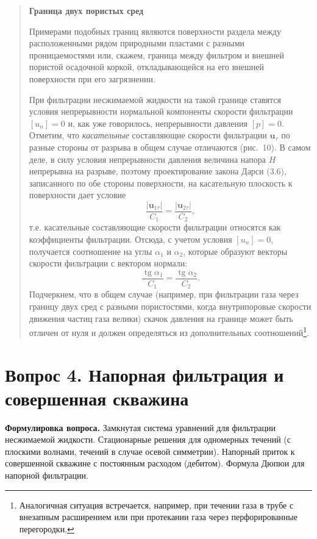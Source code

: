 \documentclass[12pt,a4paper]{article}
\newcommand{\topic}[1]{\par\medskip\noindent\textbf{#1}\par\nobreak\smallskip}
\newenvironment{textquote}{\begin{quote}\sloppy}{\end{quote}}
\newcounter{questionnumber}
\begin{document}
\begin{textquote}
\topic{Граница двух пористых сред}
Примерами подобных границ являются поверхности раздела между расположенными рядом природными пластами с разными проницаемостями или, скажем, граница между фильтром и внешней пористой осадочной коркой, откладывающейся на его внешней поверхности при его загрязнении.


При фильтрации несжимаемой жидкости на такой границе ставятся условия непрерывности нормальной компоненты скорости фильтрации $[u_n]=0$ и, как уже говорилось, непрерывности давления $[p]=0$. Отметим, что \textit{касательные} составляющие скорости фильтрации $\boldsymbol{u}_\tau$ по разные стороны от разрыва в общем случае отличаются (рис.~10). В самом деле, в силу условия непрерывности давления величина напора $H$ непрерывна на разрыве, поэтому проектирование закона Дарси (3.6), записанного по обе стороны поверхности, на касательную плоскость к поверхности дает условие
\[
\frac{|\boldsymbol{u}_{1\tau}|}{C_1}=\frac{|\boldsymbol{u}_{2\tau}|}{C_2},
\]
т.е. касательные составляющие скорости фильтрации относятся как коэффициенты фильтрации. Отсюда, с учетом условия
$[u_n]=0$, получается соотношение на углы $\alpha_1$ и $\alpha_2$, которые образуют векторы скорости фильтрации с вектором нормали:
\[
\frac{\operatorname{tg}\alpha_1}{C_1}=\frac{\operatorname{tg}\alpha_2}{C_2}.
\]
Подчеркнем, что в общем случае (например, при фильтрации газа через границу двух сред с разными пористостями, когда внутрипоровые скорости движения частиц газа велики) скачок давления на границе может быть отличен от нуля и должен определяться из дополнительных соотношений\footnote[1]{Аналогичная ситуация встречается, например, при течении газа в трубе с внезапным расширением или при протекании газа через перфорированные перегородки.}.
\end{textquote}
\endgroup

\clearpage
\setcounter{questionnumber}{4}
\setcounter{equation}{0}
\setcounter{footnote}{0}
\section*{Вопрос 4. Напорная фильтрация и совершенная скважина}
\textbf{Формулировка вопроса.} Замкнутая система уравнений для фильтрации несжимаемой жидкости. Стационарные решения для одномерных течений (с плоскими волнами, течений в случае осевой симметрии). Напорный приток к совершенной скважине с постоянным расходом (дебитом). Формула Дюпюи для напорной фильтрации.
\end{document}
